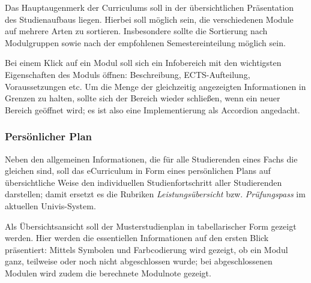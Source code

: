 \documentclass[a4paper,10pt]{scrartcl}
\begin{document}
Das Hauptaugenmerk der Curriculums soll in der übersichtlichen Präsentation des Studienaufbaus liegen. Hierbei soll möglich sein, die verschiedenen Module auf mehrere Arten zu sortieren. Insbesondere sollte die Sortierung nach Modulgruppen sowie nach der empfohlenen Semestereinteilung möglich sein.

Bei einem Klick auf ein Modul soll sich ein Infobereich mit den wichtigsten Eigenschaften des Moduls öffnen: Beschreibung, ECTS-Aufteilung, Voraussetzungen etc. Um die Menge der gleichzeitig angezeigten Informationen in Grenzen zu halten, sollte sich der Bereich wieder schließen, wenn ein neuer Bereich geöffnet wird; es ist also eine Implementierung als Accordion angedacht.

\subsubsection{Persönlicher Plan}

Neben den allgemeinen Informationen, die für alle Studierenden eines Fachs die gleichen sind, soll das eCurriculum in Form eines persönlichen Plans auf übersichtliche Weise den individuellen Studienfortschritt aller Studierenden darstellen; damit ersetzt es die Rubriken \emph{Leistungsübersicht} bzw. \emph{Prüfungspass} im aktuellen Univis-System.

\medskip
\noindent{}
\medskip

Als Übersichtsansicht soll der Musterstudienplan in tabellarischer Form gezeigt werden. Hier werden die essentiellen Informationen auf den ersten Blick präsentiert: Mittels Symbolen und Farbcodierung wird gezeigt, ob ein Modul ganz, teilweise oder noch nicht abgeschlossen wurde; bei abgeschlossenen Modulen wird zudem die berechnete Modulnote gezeigt.
\end{document}
